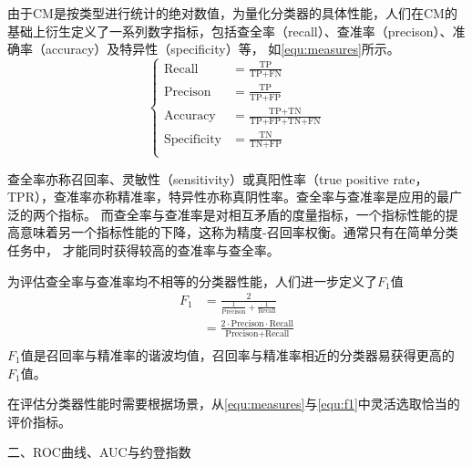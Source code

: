 \vspace{-0.8cm}
由于CM是按类型进行统计的绝对数值，为量化分类器的具体性能，人们在CM的基础上衍生定义了一系列数字指标，包括查全率（recall）、查准率（precison）、准确率（accuracy）及特异性（specificity）等，
如\autoref{equ:measures}所示。
\begin{equation}
      \label{equ:measures}
      \left \{
      \begin{aligned}
            \text{Recall}      &=\frac{\text{TP}}{\text{TP+FN}}         \\
            \text{Precison}    &=\frac{\text{TP}}{\text{TP+FP}}          \\
            \text{Accuracy}    &=\frac{\text{TP+TN}}{\text{TP+FP+TN+FN}} \\
            \text{Specificity} &=\frac{\text{TN}}{\text{TN+FP}}       \\
      \end{aligned}
      \right.
\end{equation}

查全率亦称召回率、灵敏性（sensitivity）或真阳性率（true positive rate，TPR），查准率亦称精准率，特异性亦称真阴性率。查全率与查准率是应用的最广泛的两个指标\cite{Zhou2016,Aurélien2018}。
而查全率与查准率是对相互矛盾的度量指标，一个指标性能的提高意味着另一个指标性能的下降，这称为精度-召回率权衡。通常只有在简单分类任务中，
才能同时获得较高的查准率与查全率。

为评估查全率与查准率均不相等的分类器性能，人们进一步定义了$F_1$值
\begin{equation}
      \label{equ:f1}
      \begin{aligned}
            F_1   &= \frac{2}{\frac{1}{\text{Precison}}+\frac{1}{\text{Recall}}}         \\
                  &=\frac{2\cdot \text{Precison}\cdot \text{Recall}}{\text{Precison+Recall}}          \\
      \end{aligned}
\end{equation}
$F_1$值是召回率与精准率的谐波均值，召回率与精准率相近的分类器易获得更高的$F_1$值。

在评估分类器性能时需要根据场景，从\autoref{equ:measures}与\autoref{equ:f1}中灵活选取恰当的评价指标。

二、ROC曲线、AUC与约登指数

